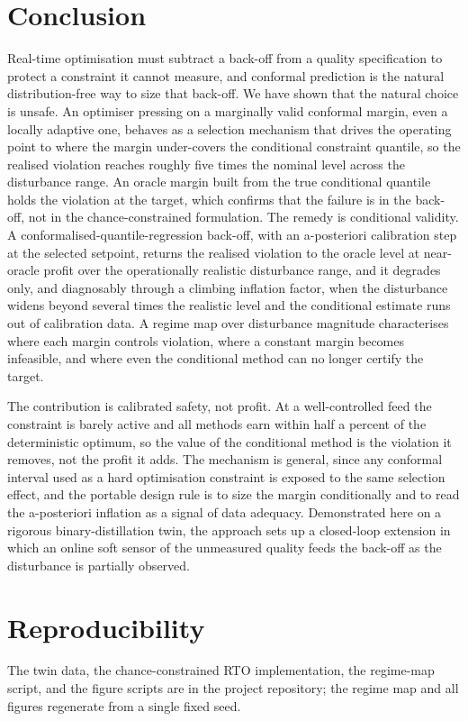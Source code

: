 \documentclass[review,times]{elsarticle}
\begin{document}
\section{Conclusion}
\label{sec:conclusion}

Real-time optimisation must subtract a back-off from a quality specification to protect a
constraint it cannot measure, and conformal prediction is the natural distribution-free way to
size that back-off. We have shown that the natural choice is unsafe. An optimiser pressing on a
marginally valid conformal margin, even a locally adaptive one, behaves as a selection mechanism
that drives the operating point to where the margin under-covers the conditional constraint
quantile, so the realised violation reaches roughly five times the nominal level across the
disturbance range. An oracle margin built from the true conditional quantile holds the violation
at the target, which confirms that the failure is in the back-off, not in the chance-constrained
formulation. The remedy is conditional validity. A conformalised-quantile-regression back-off,
with an a-posteriori calibration step at the selected setpoint, returns the realised violation to
the oracle level at near-oracle profit over the operationally realistic disturbance range, and it
degrades only, and diagnosably through a climbing inflation factor, when the disturbance widens
beyond several times the realistic level and the conditional estimate runs out of calibration
data. A regime map over disturbance magnitude characterises where each margin controls violation,
where a constant margin becomes infeasible, and where even the conditional method can no longer
certify the target.

The contribution is calibrated safety, not profit. At a well-controlled feed the constraint is
barely active and all methods earn within half a percent of the deterministic optimum, so the
value of the conditional method is the violation it removes, not the profit it adds. The mechanism
is general, since any conformal interval used as a hard optimisation constraint is exposed to the
same selection effect, and the portable design rule is to size the margin conditionally and to
read the a-posteriori inflation as a signal of data adequacy. Demonstrated here on a rigorous
binary-distillation twin, the approach sets up a closed-loop extension in which an online soft
sensor of the unmeasured quality feeds the back-off as the disturbance is partially observed.

\section*{Reproducibility}
The twin data, the chance-constrained RTO implementation, the regime-map script, and the figure
scripts are in the project repository; the regime map and all figures regenerate from a single
fixed seed.



\end{document}
